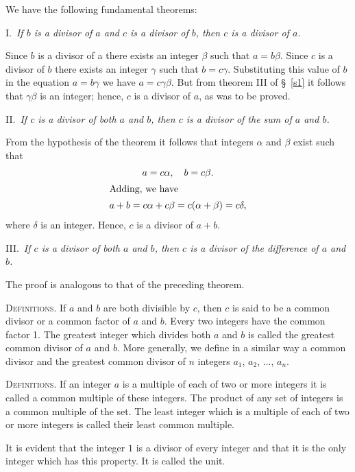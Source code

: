 \documentclass[oneside]{book}
\begin{document}
We have the following fundamental theorems:

\smallskip I.~\emph{If $b$ is a divisor of $a$ and $c$ is a divisor
of $b$, then $c$ is a divisor of $a$.}

Since $b$ is a divisor of a there exists an integer $\beta$ such
that $a = b\beta$. Since $c$ is a divisor of $b$ there exists an
integer $\gamma$ such that $b = c\gamma$. Substituting this value of
$b$ in the equation $a = b\gamma$ we have $a = c\gamma\beta$. But
from theorem III of \S~\ref{s1} it follows that $\gamma\beta$ is an
integer; hence, $c$ is a divisor of $a$, as was to be proved.

\smallskip II.~\emph{If $c$ is a divisor of both $a$ and $b$, then
$c$ is a divisor of the sum of $a$ and $b$.}

From the hypothesis of the theorem it follows that integers $\alpha$
and $\beta$ exist such that
\begin{gather*}
a = c\alpha,\quad b = c\beta. \\
\intertext{Adding, we have}
a + b = c\alpha + c\beta = c(\alpha + \beta) = c\delta,
\end{gather*}
where $\delta$ is an integer. Hence, $c$ is a divisor of $a+b$.

\smallskip III.~\emph{If $c$ is a divisor of both $a$ and $b$, then
$c$ is a divisor of the difference of $a$ and $b$.}

The proof is analogous to that of the preceding theorem.

\smallskip \textsc{Definitions.} If $a$ and $b$ are both divisible
by $c$, then $c$ is said to be a common divisor or a common factor
of $a$ and $b$. Every two integers have the common factor 1. The
greatest integer which divides both $a$ and $b$ is called the
greatest common divisor of $a$ and $b$. More generally, we define in
a similar way a common divisor and the greatest common divisor of
$n$ integers $a_1$, $a_2$, $\ldots$, $a_n$.

\smallskip \textsc{Definitions.} If an integer $a$ is a multiple of
each of two or more integers it is called a common multiple of these
integers. The product of any set of integers is a common multiple of
the set. The least integer which is a multiple of each of two or
more integers is called their least common multiple.%

It is evident that the integer $1$ is a divisor of every integer and
that it is the only integer which has this property. It is called
the unit.
\end{document}
